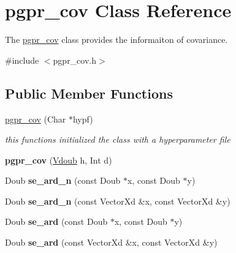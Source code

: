 \hypertarget{classpgpr__cov}{\section{pgpr\+\_\+cov Class Reference}
\label{classpgpr__cov}
}


The \hyperlink{classpgpr__cov}{pgpr\+\_\+cov} class provides the informaiton of covariance.  




{\ttfamily \#include $<$pgpr\+\_\+cov.\+h$>$}

\subsection*{Public Member Functions}
\begin{DoxyCompactItemize}
\item 
\hyperlink{classpgpr__cov_addb951bbf66b46728f94c6fab2d9b39a}{pgpr\+\_\+cov} (Char $\ast$hypf)
\begin{DoxyCompactList}\small\item\em this functions initialized the class with a hyperparameter file \end{DoxyCompactList}\item 
\hypertarget{classpgpr__cov_a0ba2630a7eed0d61906c8e61123e1cac}{{\bfseries pgpr\+\_\+cov} (\hyperlink{classpgpr__vector}{Vdoub} h, Int d)}\label{classpgpr__cov_a0ba2630a7eed0d61906c8e61123e1cac}

\item 
\hypertarget{classpgpr__cov_aff58711d31434e8c279a2f64dce8cf14}{Doub {\bfseries se\+\_\+ard\+\_\+n} (const Doub $\ast$x, const Doub $\ast$y)}\label{classpgpr__cov_aff58711d31434e8c279a2f64dce8cf14}

\item 
\hypertarget{classpgpr__cov_ae36ecbe015338320c93fb5f81b57c93e}{Doub {\bfseries se\+\_\+ard\+\_\+n} (const Vector\+Xd \&x, const Vector\+Xd \&y)}\label{classpgpr__cov_ae36ecbe015338320c93fb5f81b57c93e}

\item 
\hypertarget{classpgpr__cov_a5a420f9c6258e55e33c2fba74963e0a0}{Doub {\bfseries se\+\_\+ard} (const Doub $\ast$x, const Doub $\ast$y)}\label{classpgpr__cov_a5a420f9c6258e55e33c2fba74963e0a0}

\item 
\hypertarget{classpgpr__cov_a4055ba515dd3e46899a04b5ac882a7b3}{Doub {\bfseries se\+\_\+ard} (const Vector\+Xd \&x, const Vector\+Xd \&y)}\label{classpgpr__cov_a4055ba515dd3e46899a04b5ac882a7b3}


\end{DoxyCompactItemize}
